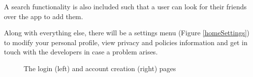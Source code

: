 \documentclass[12pt]{scrartcl}
\begin{document}
		A search functionality is also included such that a user can look for their friends over the app
		to add them.
	
		Along with everything else, there will be a settings menu (Figure \ref{homeSettings}) to modify 
		your personal profile, view privacy and policies information and get in touch with the developers 
		in case a problem arises.
		
		\newpage
	
		\begin{figure}[H]%
    			\centering
   			\qquad
    			\caption{The login (left) and account creation (right) pages}%
    			\label{loginAccount}%
		\end{figure}
		
\end{document}
